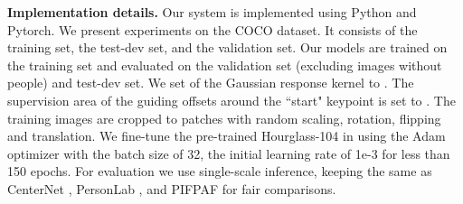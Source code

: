 \documentclass{article}
\begin{document}
\begin{table}[tp]
	\centering
	\setlength{\belowcaptionskip}{-1pt} 
	\caption{
		Results of accuracy and speed on the COCO validation set. We use single-scale inference and the same computer with a 2080 Ti GPU to test speed equally. The faster speed in parenthesis is obtained using AMP FP16 inference.
	}
	\label{tab:ablation results}
\small
	\centering
	\begin{threeparttable}
	\end{threeparttable}
	\vspace{-3mm}
\end{table}

\textbf{Implementation details.} Our system is implemented using Python and Pytorch.  We present experiments on the COCO  dataset.
It consists of  the training set, the test-dev set, and the validation set.
Our models are trained on the training set and evaluated on the validation set (excluding images without people) and test-dev set. We set  of the Gaussian response kernel to . The supervision area of the guiding offsets around the ``start" keypoint is set to .
The training images are cropped to  patches with random scaling, rotation, flipping and translation. We fine-tune the pre-trained Hourglass-104 in \cite{Zhou:2019ta} using the Adam optimizer with the batch size of 32, the initial learning rate of 1e-3 for less than 150 epochs. For evaluation we use single-scale inference, keeping the same as CenterNet \cite{Zhou:2019ta}, PersonLab \cite{Papandreou2018PersonLab}, and PIFPAF \cite{kreiss2019pifpaf} for fair comparisons.
\end{document}
